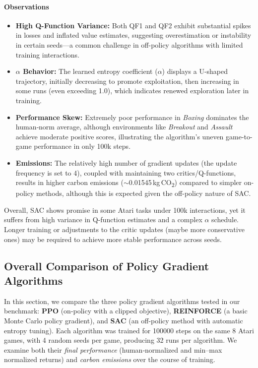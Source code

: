 \paragraph{Observations}
\begin{itemize}
	\item \textbf{High Q-Function Variance:} Both QF1 and QF2 exhibit substantial spikes in losses and inflated value estimates, suggesting overestimation or instability in certain seeds—a common challenge in off-policy algorithms with limited training interactions.
	\item \textbf{$\alpha$ Behavior:} The learned entropy coefficient ($\alpha$) displays a U-shaped trajectory, initially decreasing to promote exploitation, then increasing in some runs (even exceeding 1.0), which indicates renewed exploration later in training.
	\item \textbf{Performance Skew:} Extremely poor performance in \emph{Boxing} dominates the human‐norm average, although environments like \emph{Breakout} and \emph{Assault} achieve moderate positive scores, illustrating the algorithm's uneven game-to-game performance in only 100k steps.
	\item \textbf{Emissions:} The relatively high number of gradient updates (the update frequency is set to 4), coupled with maintaining two critics/Q-functions, results in higher carbon emissions ($\sim$\num{0.01545}\,kg\,CO\textsubscript{2}) compared to simpler on-policy methods, although this is expected given the off-policy nature of SAC.
\end{itemize}

Overall, SAC shows promise in some Atari tasks under 100k interactions, yet it suffers from high variance in Q-function estimates and a complex $\alpha$ schedule. Longer training or adjustments to the critic updates (maybe more conservative ones) may be required to achieve more stable performance across seeds.

\subsection{Overall Comparison of Policy Gradient Algorithms}
\label{subsec:policy_comparison}
In this section, we compare the three policy gradient algorithms tested in our benchmark: \textbf{PPO} (on-policy with a clipped objective), \textbf{REINFORCE} (a basic Monte Carlo policy gradient), and \textbf{SAC} (an off-policy method with automatic entropy tuning). Each algorithm was trained for \num{100000} steps on the same 8 Atari games, with 4 random seeds per game, producing 32 runs per algorithm. We examine both their \emph{final performance} (human‐normalized and min–max normalized returns) and \emph{carbon emissions} over the course of training.

